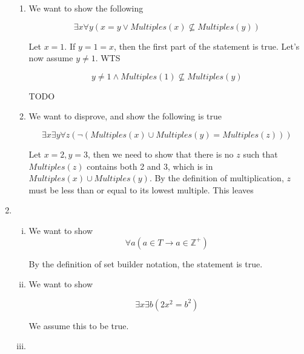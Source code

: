\documentclass{article}
\newcommand{\Z}{\mathbb{Z}}
\newcommand{\mult}{\textit{Multiples}}
\begin{document}
\begin{enumerate}
\begin{enumerate}
		      \item We want to show the following

		            $$
			            \exists x \forall y (x = y \lor \textit{Multiples}(x)
			            \not\subseteq \textit{Multiples}(y))
		            $$

		            Let $x = 1$. If $y = 1 = x$, then the first part of the statement is true. Let's
		            now assume $y \ne 1$. WTS

		            $$
			            y \ne 1 \land
			            \textit{Multiples}(1)
			            \not\subseteq \textit{Multiples}(y)
		            $$

		            TODO

		      \item We want to disprove, and show the following is true

		            $$
			            \exists x \exists y \forall z (\lnot (\mult(x) \cup \mult(y) = \mult(z)))
		            $$

		            Let $x=2, y=3$, then we need to show that there is no $z$ such that $\mult(z)$
		            contains both 2 and 3, which is in $\mult(x) \cup \mult(y)$. By the definition
		            of multiplication, $z$ must be less than or equal to its lowest multiple. This leaves

	      \end{enumerate}

	\item \begin{enumerate}[(i)]
		      \item  We want to show
		            $$
			            \forall a (a \in T \to a \in \Z^+)
		            $$

		            By the definition of set builder notation, the statement is true.

		      \item We want to show

		            $$
			            \exists x \exists b (2x^2 = b^2)
		            $$

		            We assume this to be true.

		      \item

	      \end{enumerate}
\end{enumerate}
\end{document}
